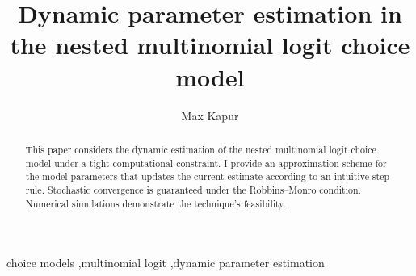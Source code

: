 \documentclass[preprint,12pt,authoryear]{elsarticle}
\begin{document}
\begin{frontmatter}


 \title{Dynamic parameter estimation in the nested multinomial logit choice model}
 \author{Max Kapur}
 \address{Seoul National University, Department of Industrial Engineering, 1 Gwanak-ro, Gwanak-gu, Seoul 08826, Republic of Korea}

\begin{abstract}
This paper considers the dynamic estimation of the nested multinomial logit choice model under a tight computational constraint. I provide an approximation scheme for the model parameters that updates the current estimate according to an intuitive step rule. Stochastic convergence is guaranteed under the Robbins--Monro condition. Numerical simulations demonstrate the technique's feasibility.
\end{abstract}



\begin{keyword}
choice models \sep multinomial logit \sep dynamic parameter estimation



\end{keyword}

\end{frontmatter}
\end{document}
